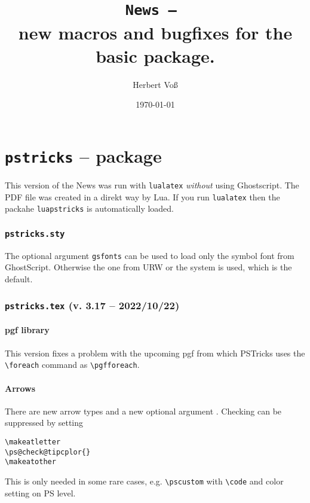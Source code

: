 \documentclass[11pt,english,BCOR=10mm,DIV=12,bibliography=totoc,parskip=false,headings=small,
    headinclude=false,footinclude=false,twoside,usegeometry,dvipsnames]{pst-doc}
\def\Lcs#1{\texttt{\textbackslash#1}}
\begin{document}
\title{\texttt{News -- \the\year}\\ \Large new macros and bugfixes for the basic package.}
\author{Herbert Voß}
\date{\today}

\settitle

\tableofcontents

\part{\texttt{pstricks} -- package}

This version of the News was run with \verb|lualatex| \emph{without} using Ghostscript.
The PDF file was created in a direkt way by Lua. If you run \texttt{lualatex} then the
packahe \texttt{luapstricks} is automatically loaded.


\section{\texttt{pstricks.sty}}
The optional argument \texttt{gsfonts} can be used to load only the symbol font from GhostScript.
Otherwise the one from URW or the system is used, which is the default.



\section{\texttt{pstricks.tex} (v. 3.17 -- 2022/10/22)}


\subsection{pgf library}

This version fixes a problem with the upcoming pgf from which PSTricks uses the \Lcs{foreach}
command as \Lcs{pgfforeach}.

\subsection{Arrows}


There are new arrow types and a new optional argument .
Checking  can be suppressed by setting

\begin{verbatim}
\makeatletter
\ps@check@tipcplor{}
\makeatother
\end{verbatim}

This is only needed in some rare cases, e.g. \Lcs{pscustom} with \Lcs{code} and
color setting on PS level.


\nocite{*}
\printbibliography
\end{document}
